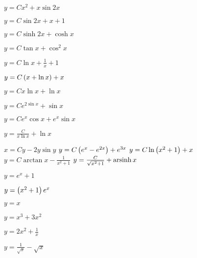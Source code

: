 \begin{enumsols}
		\item \( y = Cx^2 + x \sin{2x} \) %
		\item \( y = C \sin{2x} + x + 1 \) %
		\item \( y = C \sinh{2x} + \cosh{x} \) %
		\item \( y = C \tan{x} + \cos^2{x} \) %
		\item \( y = C \ln{x} + \frac{1}{x} + 1 \) %
		\item \( y = C \left( x + \ln{x} \right) + x \) %
		\item \( y = Cx \ln{x} + \ln{x} \) %
		\item \( y = Ce^{2 \sin{x}} + \sin{x} \) %
		\item \( y = Ce^{x} \cos{x} + e^{x} \sin{x} \) %
		\item \( y = \frac{C}{x \ln{x}} + \ln{x} \) %
		\item \( x = Cy - 2y \sin{y} \) %
		\itemstar \( y = C \left( e^{x} - e^{2x} \right) + e^{3x} \) %
		\itemstar \( y = C \ln\left( x^2 + 1 \right) + x \) %
		\itemstar \( y = C \arctan{x} - \frac{1}{x^2 + 1} \) %
		\itemstar \( y = \frac{C}{\sqrt{x^2 + 1}} + \operatorname{arsinh}{x} \) %

		\label{sol:firstorder:linear_cauchy}

		\item \( y = e^{x} + 1 \) %
		\item \( y = \left( x^2 + 1 \right) e^{x} \) %
		\item \( y = x \) %
		\item \( y = x^3 + 3x^2 \) %
		\item \( y = 2x^2 + \frac{1}{x} \) %
		\item \( y = \frac{1}{\sqrt{x}} - \sqrt{x} \) %


\end{enumsols}

